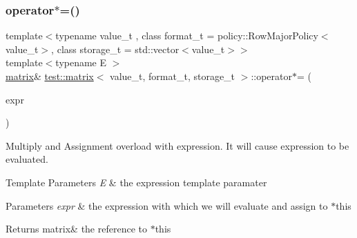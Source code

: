 \subsubsection{\texorpdfstring{operator$\ast$=()}{operator*=()}}
{\footnotesize\ttfamily template$<$typename value\+\_\+t , class format\+\_\+t  = policy\+::\+Row\+Major\+Policy$<$value\+\_\+t$>$, class storage\+\_\+t  = std\+::vector$<$value\+\_\+t$>$$>$ \\
template$<$typename E $>$ \\
\mbox{\hyperlink{classtest_1_1matrix}{matrix}}\& \mbox{\hyperlink{classtest_1_1matrix}{test\+::matrix}}$<$ value\+\_\+t, format\+\_\+t, storage\+\_\+t $>$\+::operator$\ast$= (\begin{DoxyParamCaption}\item[{\mbox{\hyperlink{classtest_1_1expression}{expression}}$<$ E $>$ const \&}]{expr }\end{DoxyParamCaption})\hspace{0.3cm}{\ttfamily [inline]}}



Multiply and Assignment overload with expression. It will cause expression to be evaluated. 


\begin{DoxyTemplParams}{Template Parameters}
{\em E} & the expression template paramater \\
\hline
\end{DoxyTemplParams}

\begin{DoxyParams}{Parameters}
{\em expr} & the expression with which we will evaluate and assign to $\ast$this \\
\hline
\end{DoxyParams}
\begin{DoxyReturn}{Returns}
matrix\& the reference to $\ast$this 
\end{DoxyReturn}
\mbox{\label{classtest_1_1matrix_acacdf5c7f4c7c687691b8daf03d1821d}} 
